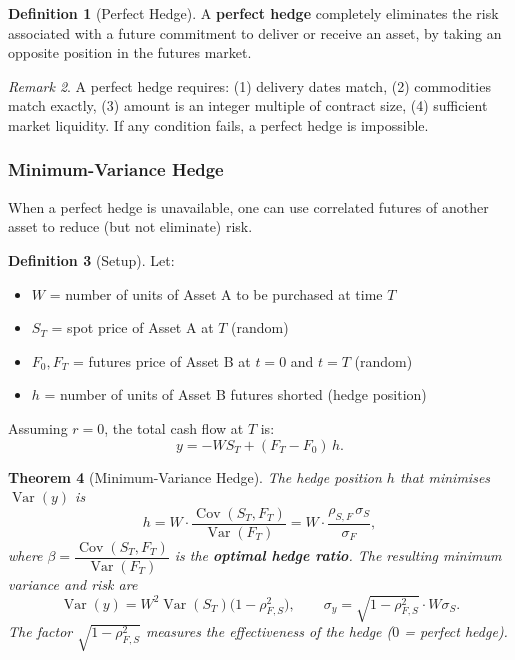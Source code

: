 \documentclass[12pt, a4paper]{article}
\theoremstyle{plain}
\newtheorem{theorem}{Theorem}[section]
\theoremstyle{definition}
\newtheorem{definition}[theorem]{Definition}
\theoremstyle{remark}
\newtheorem{remark}[theorem]{Remark}
\begin{document}
\begin{definition}[Perfect Hedge]
  A \textbf{perfect hedge} completely eliminates the risk associated with a future commitment to deliver or receive an asset, by taking an opposite position in the futures market.
\end{definition}

\begin{remark}
  A perfect hedge requires: (1) delivery dates match, (2) commodities match exactly, (3) amount is an integer multiple of contract size, (4) sufficient market liquidity. If any condition fails, a perfect hedge is impossible.
\end{remark}

\subsubsection{Minimum-Variance Hedge}

When a perfect hedge is unavailable, one can use correlated futures of another asset to reduce (but not eliminate) risk.

\begin{definition}[Setup]
  Let:
  \begin{itemize}
    \item $W$ = number of units of Asset A to be purchased at time $T$
    \item $S_T$ = spot price of Asset A at $T$ (random)
    \item $F_0, F_T$ = futures price of Asset B at $t=0$ and $t=T$ (random)
    \item $h$ = number of units of Asset B futures shorted (hedge position)
  \end{itemize}
  Assuming $r=0$, the total cash flow at $T$ is:
  \[
    y = -W S_T + (F_T - F_0)\,h.
  \]
\end{definition}

\begin{theorem}[Minimum-Variance Hedge]\label{thm: min-var-hedge}
  The hedge position $h$ that minimises $\operatorname{Var}(y)$ is
  \[
    h = W \cdot \frac{\operatorname{Cov}(S_T, F_T)}{\operatorname{Var}(F_T)} = W \cdot \frac{\rho_{S,F} \,\sigma_S}{\sigma_F},
  \]
  where $\beta = \dfrac{\operatorname{Cov}(S_T, F_T)}{\operatorname{Var}(F_T)}$ is the \textbf{optimal hedge ratio}. The resulting minimum variance and risk are
  \[
    \operatorname{Var}(y) = W^2 \operatorname{Var}(S_T)\bigl(1 - \rho_{F,S}^2\bigr), \qquad \sigma_y = \sqrt{1-\rho_{F,S}^2} \cdot W\sigma_S.
  \]
  The factor $\sqrt{1 - \rho_{F,S}^2}$ measures the \emph{effectiveness} of the hedge ($0$ = perfect hedge).
\end{theorem}
\end{document}
